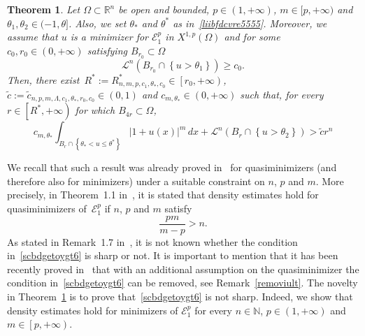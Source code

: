 \documentclass[12pt]{article}
\newcommand{\R}{\mathbb{R}}
\newcommand{\N}{\mathbb{N}}
\numberwithin{equation}{section}
\newtheorem{thm}{Theorem}[section]
\renewcommand{\leq}{\leqslant}
\renewcommand{\geq}{\geqslant}
\begin{document}
 


\begin{thm}\label{viredghloprec45}
Let $\Omega\subset\R^n$ be open and bounded, $p\in(1,+\infty)$, $m\in[p,+\infty)$ and $\theta_1,\theta_2\in (-1, \theta]$. Also, we set $\theta_{*}$ and $\theta^*$ as in~\eqref{liibfdcvre5555}. Moreover, we assume that $u$ is a minimizer for $\mathcal{E}_1^p$ in $X^{1,p}(\Omega)$ and  for some $c_0,r_0\in (0,+\infty)$  satisfying $B_{r_0}\subset\Omega$ 
\begin{equation}\label{xldvaxknterv543}
\mathcal{L}^n(B_{r_0}\cap \left\lbrace u>\theta_1\right\rbrace)\geq c_0.
\end{equation} 
Then, there exist~$R^*:=R_{n,m,p,c_1,\theta_*,c_0}^*\in\left[r_0,+\infty\right)$, $\tilde{c}:=\tilde{c}_{n,p,m,\Lambda,c_1,\theta_*,r_0,c_0}\in(0,1)$ and $c_{m,\theta_*}\in(0,+\infty)$ such that,
for every $r\in \left[R^*,+\infty\right)$ for which $B_{4r}\subset\Omega$,
\begin{equation*}
c_{m,\theta_*}\int_{B_r\cap \left\lbrace \theta_{*}<u\leq \theta^* \right\rbrace}\left|1+u(x)\right|^m\,dx+\mathcal{L}^n(B_r\cap \left\lbrace u>\theta_2 \right\rbrace)>\tilde{c}r^n
\end{equation*}
\end{thm}
We recall that such a result was already proved in~\cite{1} for quasiminimizers (and therefore also for minimizers) under a suitable constraint on $n$, $p$ and $m$. More precisely, in Theorem~1.1 in~\cite{1}, it is stated that density estimates hold for quasiminimizers of~$\mathcal{E}_1^p$ if $n$, $p$ and $m$ satisfy 
\begin{equation}\label{scbdgetoygt6}
\frac{pm}{m-p}>n.
\end{equation} 
As stated in Remark~1.7 in~\cite{1}, it is not known whether the condition in~\eqref{scbdgetoygt6} is sharp or not. It is important to mention that it has been recently proved in~\cite{savin2025density} that with an additional assumption on the quasiminimizer the condition in~\eqref{scbdgetoygt6} can be removed, see Remark~\ref{removiult}. The novelty in Theorem~\ref{viredghloprec45} is to prove that~\eqref{scbdgetoygt6} is not sharp. Indeed, we show that density estimates hold for minimizers of $\mathcal{E}_1^p$ for every $n\in\N$, $p\in (1,+\infty)$ and $m\in \left[p,+\infty\right)$. 
\end{document}
